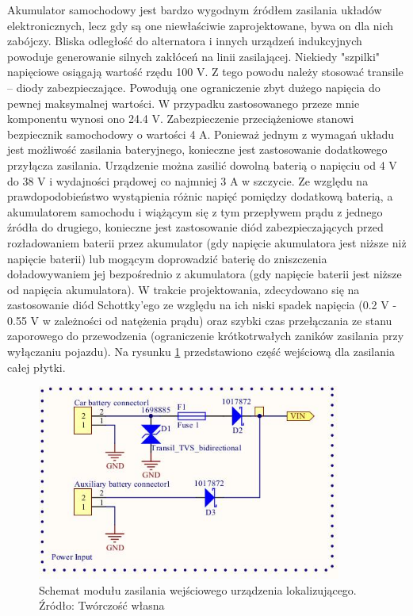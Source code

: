 Akumulator samochodowy jest bardzo wygodnym źródłem zasilania układów elektronicznych, lecz gdy są one niewłaściwie zaprojektowane, bywa on dla nich zabójczy. Bliska odległość do alternatora i innych urządzeń indukcyjnych powoduje generowanie silnych zakłóceń na linii zasilającej. Niekiedy "szpilki" napięciowe osiągają wartość rzędu 100 V. Z tego powodu należy stosować transile – diody zabezpieczające. Powodują one ograniczenie zbyt dużego napięcia do pewnej maksymalnej wartości. W przypadku zastosowanego przeze mnie komponentu wynosi ono 24.4 V. Zabezpieczenie przeciążeniowe stanowi bezpiecznik samochodowy o wartości 4 A. 
Ponieważ jednym z wymagań układu jest możliwość zasilania bateryjnego, konieczne jest zastosowanie dodatkowego przyłącza zasilania. Urządzenie można zasilić dowolną baterią o napięciu od 4 V do 38 V i wydajności prądowej co najmniej 3 A w szczycie. Ze względu na prawdopodobieństwo wystąpienia różnic napięć pomiędzy dodatkową baterią, a akumulatorem samochodu i wiążącym się z tym przepływem prądu z jednego źródła do drugiego, konieczne jest zastosowanie diód zabezpieczających przed rozładowaniem baterii przez akumulator (gdy napięcie akumulatora jest niższe niż napięcie baterii) lub mogącym doprowadzić baterię do zniszczenia doładowywaniem jej bezpośrednio z akumulatora (gdy napięcie baterii jest niższe od napięcia akumulatora). W trakcie projektowania, zdecydowano się na zastosowanie diód Schottky’ego ze względu na ich niski spadek napięcia (0.2 V - 0.55 V w zależności od natężenia prądu) oraz szybki czas przełączania ze stanu zaporowego do przewodzenia (ograniczenie krótkotrwałych zaników zasilania przy wyłączaniu pojazdu). Na rysunku \ref{fig:image_mainboard_power_input} przedstawiono część wejściową dla zasilania całej płytki.

\begin{figure}[H]
	\centering
	\includegraphics[width=10cm]{img/schematics/mainboard_power_input.jpg}
	\caption{Schemat modułu zasilania wejściowego urządzenia lokalizującego. \\ Źródło: Twórczość własna}
	\label{fig:image_mainboard_power_input}
\end{figure}

